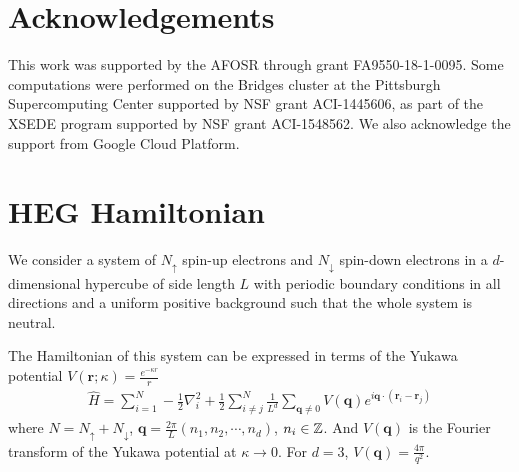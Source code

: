\documentclass[%
reprint,
 superscriptaddress,
 amsmath,amssymb,
 aps,
]{revtex4-1}
\begin{document}
\label{conclusions}

\section{Acknowledgements}
This work was supported by the AFOSR through grant FA9550-18-1-0095.
Some computations were performed on the Bridges cluster at the Pittsburgh Supercomputing Center supported by NSF grant ACI-1445606, as part of the XSEDE program supported by NSF grant ACI-1548562.
We also acknowledge the support from Google Cloud Platform.

%
\appendix

\section{HEG Hamiltonian}
\label{app:heg}
We consider a system of $N_\uparrow$ spin-up electrons and $N_\downarrow$ spin-down electrons in a $d$-dimensional hypercube of side length $L$ with periodic boundary conditions in all directions and a uniform positive background such that the whole system is neutral.

The Hamiltonian of this system can be expressed in terms of the Yukawa potential $V\left( {\mathbf{r};\kappa } \right) = \frac{{{e^{ - \kappa r}}}}{r}$
\begin{align*}
\hat{H}=\sum_{i=1}^{N}-\frac{1}{2}\nabla_i^2+\frac{1}{2}\sum_{i\ne j}^{N} \frac{1}{L^d}\sum_{\mathbf{q}\ne 0}V(\mathbf{q})e^{i\mathbf{q}\cdot(\mathbf{r}_i-\mathbf{r}_j)}
\end{align*}
where 
$N= N_\uparrow + N_\downarrow$,
$\mathbf{q}=\frac{2\pi}{L}(n_1, n_2, \cdots, n_d)$, $n_i\in\Bbb{Z}$.
And $V(\mathbf{q})$ is the Fourier transform of the Yukawa potential at $\kappa\to 0$.
For $d=3$, $V(\mathbf{q})=\frac{4\pi}{q^2}$. \cite{giuliani2005quantum}
\end{document}
